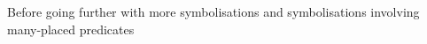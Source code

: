 Before going further with more symbolisations and symbolisations involving many-placed predicates





%
%
%
%
%
%
%
%
%
%
%
%

